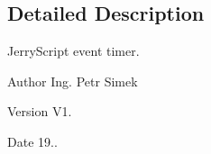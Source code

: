 \subsection{Detailed Description}
Jerry\+Script event timer. 

\begin{DoxyAuthor}{Author}
Ing. Petr Simek 
\end{DoxyAuthor}
\begin{DoxyVersion}{Version}
V1. 
\end{DoxyVersion}
\begin{DoxyDate}{Date}
19.. 
\end{DoxyDate}
